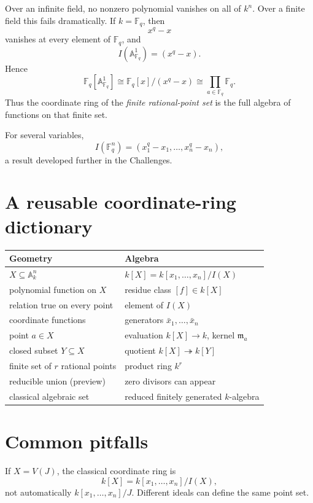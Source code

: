 Over an infinite field, no nonzero polynomial vanishes on all of \(k^n\).  Over a finite
field this fails dramatically.  If \(k=\mathbb F_q\), then
\[
x^q-x
\]
vanishes at every element of \(\mathbb F_q\), and
\[
I(\mathbb A^1_{\mathbb F_q})=(x^q-x).
\]
Hence
\[
\mathbb F_q[\mathbb A^1_{\mathbb F_q}]
\cong \mathbb F_q[x]/(x^q-x)
\cong \prod_{a\in\mathbb F_q}\mathbb F_q.
\]
Thus the coordinate ring of the \emph{finite rational-point set} is the full algebra of
functions on that finite set.

For several variables,
\[
I(\mathbb F_q^n)=(x_1^q-x_1,\dots,x_n^q-x_n),
\]
a result developed further in the Challenges.

\section{A reusable coordinate-ring dictionary}
\label{sec:vi03-dictionary}

\begin{center}
\begin{tabular}{@{}p{}p{}@{}}
\toprule
\textbf{Geometry} & \textbf{Algebra}\\
\midrule
\(X\subseteq\mathbb A_k^n\) & \(k[X]=k[x_1,\dots,x_n]/I(X)\)\\
polynomial function on \(X\) & residue class \([f]\in k[X]\)\\
relation true on every point & element of \(I(X)\)\\
coordinate functions & generators \(\bar x_1,\dots,\bar x_n\)\\
point \(a\in X\) & evaluation \(k[X]\to k\), kernel \(\mathfrak m_a\)\\
closed subset \(Y\subseteq X\) & quotient \(k[X]\twoheadrightarrow k[Y]\)\\
finite set of \(r\) rational points & product ring \(k^r\)\\
reducible union (preview) & zero divisors can appear\\
classical algebraic set & reduced finitely generated \(k\)-algebra\\
\bottomrule
\end{tabular}
\end{center}

\section{Common pitfalls}
\label{sec:vi03-pitfalls}

\begin{warning}
If \(X=V(J)\), the classical coordinate ring is
\[
k[X]=k[x_1,\dots,x_n]/I(X),
\]
not automatically \(k[x_1,\dots,x_n]/J\).  Different ideals can define the same point set.
\end{warning}

